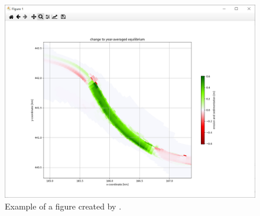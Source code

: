 \begin{figure}
\center
\includegraphics[width=\textwidth]{figures/Palmerswaard_fig_zoomed.png}
\caption{Example of a figure created by \dfastmi.}
\label{Figure_example}
\end{figure}